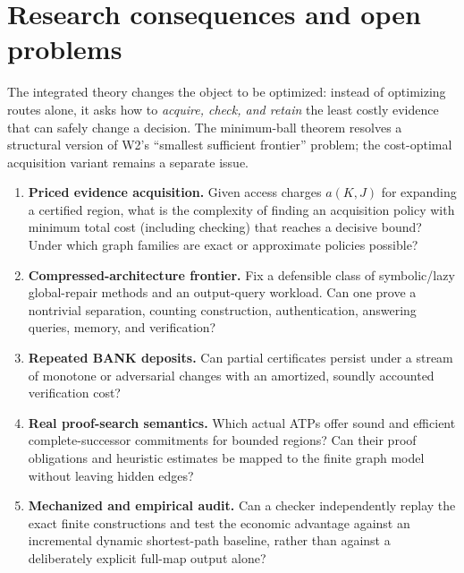 \documentclass[11pt,letterpaper]{article}
\theoremstyle{definition}
\theoremstyle{remark}
\begin{document}
\section{Research consequences and open problems}
The integrated theory changes the object to be optimized: instead of optimizing routes alone, it asks how to \emph{acquire, check, and retain} the least costly evidence that can safely change a decision. The minimum-ball theorem resolves a structural version of W2's ``smallest sufficient frontier'' problem; the cost-optimal acquisition variant remains a separate issue.
\begin{enumerate}[label=\textbf{Q\arabic*.},itemsep=.5em]
\item \textbf{Priced evidence acquisition.} Given access charges \(a(K,J)\) for expanding a certified region, what is the complexity of finding an acquisition policy with minimum total cost (including checking) that reaches a decisive bound? Under which graph families are exact or approximate policies possible?
\item \textbf{Compressed-architecture frontier.} Fix a defensible class of symbolic/lazy global-repair methods and an output-query workload. Can one prove a nontrivial separation, counting construction, authentication, answering queries, memory, and verification?
\item \textbf{Repeated BANK deposits.} Can partial certificates persist under a stream of monotone or adversarial changes with an amortized, soundly accounted verification cost?
\item \textbf{Real proof-search semantics.} Which actual ATPs offer sound and efficient complete-successor commitments for bounded regions? Can their proof obligations and heuristic estimates be mapped to the finite graph model without leaving hidden edges?
\item \textbf{Mechanized and empirical audit.} Can a checker independently replay the exact finite constructions and test the economic advantage against an incremental dynamic shortest-path baseline, rather than against a deliberately explicit full-map output alone?
\end{enumerate}
\end{document}
